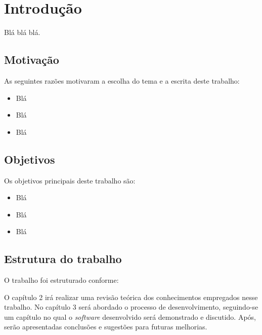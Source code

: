 \chapter{Introdução}

Blá blá blá.

\section{Motivação}
As seguintes razões motivaram a escolha do tema e a escrita deste trabalho:
\begin{itemize}
\item Blá
\item Blá
\item Blá
\end{itemize}

\section{Objetivos}

Os objetivos principais deste trabalho são:

\begin{itemize}
\item Blá
\item Blá
\item Blá 
\end{itemize}


\section{Estrutura do trabalho}
O trabalho foi estruturado conforme:

O capítulo 2 irá realizar uma revisão teórica dos conhecimentos empregados nesse trabalho. No capítulo 3 será abordado o processo de desenvolvimento, seguindo-se um capítulo no qual o \textit{software} desenvolvido será demonstrado e discutido. Após, serão apresentadas conclusões e sugestões para futuras melhorias.


